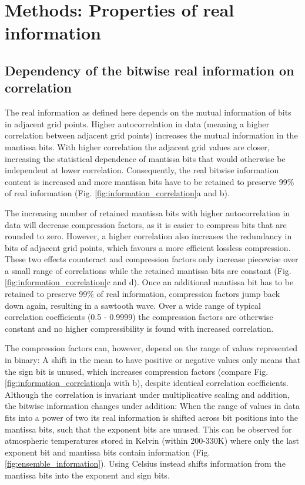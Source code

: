 \section{Methods: Properties of real information}
\label{sec:compression_methods_properties}

\subsection{Dependency of the bitwise real information on correlation}

The real information as defined here depends on the mutual information of bits in adjacent grid points.
Higher autocorrelation in data (meaning a higher correlation between adjacent grid points) increases the
mutual information in the mantissa bits. With higher correlation the adjacent grid values are closer,
increasing the statistical dependence of mantissa bits that would otherwise be independent at lower correlation.
Consequently, the real bitwise information content is increased and more mantissa bits have to be retained to
preserve 99\% of real information (Fig. \ref{fig:information_correlation}a and b).

The increasing number of retained mantissa bits with higher autocorrelation in data will decrease compression factors,
as it is easier to compress bits that are rounded to zero. However, a higher correlation also increases the redundancy
in bits of adjacent grid points, which favours a more efficient lossless compression. These two effects counteract and
compression factors only increase piecewise over a small range of correlations while the retained mantissa bits are
constant (Fig. \ref{fig:information_correlation}c and d). Once an additional mantissa bit has to be retained to preserve
99\% of real information, compression factors jump back down again, resulting in a sawtooth wave. Over a wide
range of typical correlation coefficients (0.5 - 0.9999) the compression factors are otherwise constant and no higher
compressibility is found with increased correlation. 

The compression factors can, however, depend on the range of values represented in binary: A shift in the mean to have
positive or negative values only means that the sign bit is unused, which increases compression factors
(compare Fig. \ref{fig:information_correlation}a with b), despite identical correlation coefficients. Although the correlation
is invariant under multiplicative scaling and addition, the bitwise information changes under addition: When the range of
values in data fits into a power of two its real information is shifted across bit positions into the mantissa bits, such that
the exponent bits are unused. This can be observed for atmospheric temperatures stored in Kelvin (within 200-330K)
where only the last exponent bit and mantissa bits contain information (Fig. \ref{fig:ensemble_information}).
Using Celsius instead shifts information from the mantissa bits into the exponent and sign bits.

